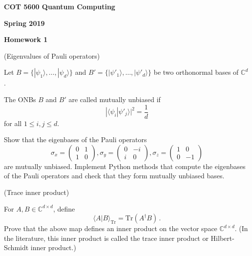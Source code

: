 \documentclass[12pt]{article}
\renewcommand{\>}{\rangle}
\newcommand{\<}{\langle}
\newcommand{\C}{\mathbb{C}}
\begin{document}
\begin{center}
{\bf COT 5600 Quantum Computing} 

\medskip
{\bf Spring 2019}

\bigskip

{\bf Homework 1}
\end{center}

\newpage


 (Eigenvalues of Pauli operators)

\medskip
\noindent
Let $B=\{|\psi_1\>,\ldots,|\psi_d\>\}$ and $B'=\{|\psi'_1\>,\ldots,|\psi'_d\>\}$ be two orthonormal bases of $\C^d$. 

The ONBs $B$ and $B'$ are called mutually unbiased if 
\[
|\< \psi_i | \psi'_j \>|^2 = \frac{1}{d} 
\]
for all $1\le i,j \le d$.

Show that the eigenbases of the Pauli operators 
\[
\sigma_x = 
\left(
\begin{array}{cc}
0 & 1 \\
1 & 0
\end{array}
\right),
%
\sigma_y = 
\left(
\begin{array}{cc}
0 & -i \\
i & 0
\end{array}
\right),
%
\sigma_z = 
\left(
\begin{array}{cc}
1 & 0 \\
0 & -1
\end{array}
\right)
\]
are mutually unbiased. Implement Python methods that compute the eigenbases of the Pauli operators and check that they form mutually unbiased bases.















\newpage


 (Trace inner product)

\medskip
\noindent
For $A,B\in\C^{d\times d}$, define
\[
\< A | B\>_{\mathrm{Tr}} = \mathrm{Tr}(A^\dagger B)\,.
\]
Prove that the above map defines an inner product on the vector space $\C^{d\times d}$. (In the literature, this inner product is called the trace inner product or Hilbert-Schmidt inner product.) \newline
\end{document}
